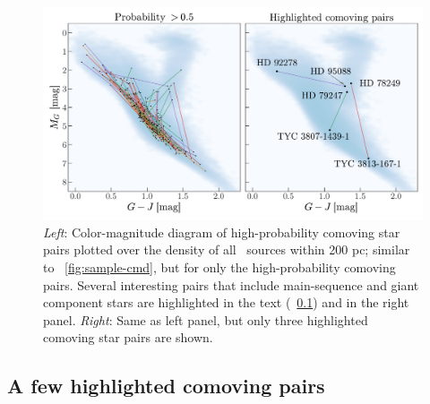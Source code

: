 \documentclass[modern, letterpaper]{aastex61}
\newcommand{\tgas}{\acronym{TGAS}}
\begin{document}
\begin{figure}[htbp]
  \begin{center}
    \includegraphics[width=\linewidth]{genuine_highlighted_cmd.pdf}
  \end{center}
  \caption{%
    {\it Left}: Color-magnitude diagram of high-probability comoving star pairs
    plotted over the density of all \tgas\ sources within 200 pc; similar to
    \figurename~\ref{fig:sample-cmd}, but for only the high-probability comoving pairs.
    Several interesting pairs that include main-sequence and giant component
    stars are highlighted in the text (\sectionname~\ref{sec:interesting-pairs})
    and in the right panel.
    {\it Right}: Same as left panel, but only three highlighted comoving star
    pairs are shown.
    \label{fig:genuine-highlighted-cmd}}
\end{figure}

\subsection{A few highlighted comoving pairs}\label{sec:interesting-pairs}
\end{document}
